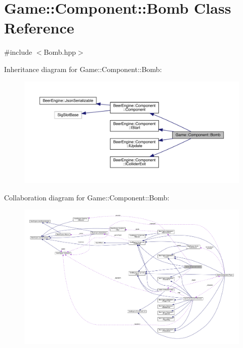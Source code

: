 \hypertarget{class_game_1_1_component_1_1_bomb}{}\section{Game\+:\+:Component\+:\+:Bomb Class Reference}
\label{class_game_1_1_component_1_1_bomb}


{\ttfamily \#include $<$Bomb.\+hpp$>$}



Inheritance diagram for Game\+:\+:Component\+:\+:Bomb\+:
\nopagebreak
\begin{figure}[H]
\begin{center}
\leavevmode
\includegraphics[width=350pt]{class_game_1_1_component_1_1_bomb__inherit__graph}
\end{center}
\end{figure}


Collaboration diagram for Game\+:\+:Component\+:\+:Bomb\+:
\nopagebreak
\begin{figure}[H]
\begin{center}
\leavevmode
\includegraphics[width=350pt]{class_game_1_1_component_1_1_bomb__coll__graph}
\end{center}
\end{figure}
